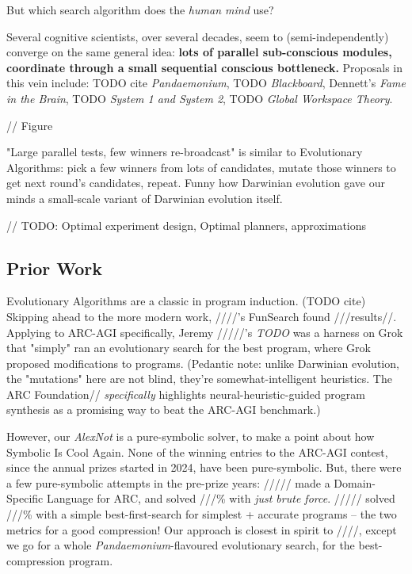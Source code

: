 \documentclass{article}
\begin{document}
But which search algorithm does the \textit{human mind} use?

Several cognitive scientists, over several decades, seem to (semi-independently) converge on the same general idea: \textbf{lots of parallel sub-conscious modules, coordinate through a small sequential conscious bottleneck.} Proposals in this vein include: TODO cite \textit{Pandaemonium}, TODO \textit{Blackboard}, Dennett's \textit{Fame in the Brain}, TODO \textit{System 1 and System 2}, TODO \textit{Global Workspace Theory}.

// Figure

"Large parallel tests, few winners re-broadcast" is similar to Evolutionary Algorithms: pick a few winners from lots of candidates, mutate those winners to get next round's candidates, repeat. Funny how Darwinian evolution gave our minds a small-scale variant of Darwinian evolution itself.

// TODO: Optimal experiment design, Optimal planners, approximations

\subsection{Prior Work}

Evolutionary Algorithms are a classic in program induction. (TODO cite) Skipping ahead to the more modern work, ////'s FunSearch found ///results//. Applying to ARC-AGI specifically, Jeremy /////'s \textit{TODO} was a harness on Grok that "simply" ran an evolutionary search for the best program, where Grok proposed modifications to programs. (Pedantic note: unlike Darwinian evolution, the "mutations" here are not blind, they're somewhat-intelligent heuristics. The ARC Foundation// \textit{specifically} highlights neural-heuristic-guided program synthesis as a promising way to beat the ARC-AGI benchmark.)

However, our \textit{AlexNot} is a pure-symbolic solver, to make a point about how Symbolic Is Cool Again. None of the winning entries to the ARC-AGI contest, since the annual prizes started in 2024, have been pure-symbolic. But, there were a few pure-symbolic attempts in the pre-prize years: ///// made a Domain-Specific Language for ARC, and solved ///\% with \textit{just brute force}. ///// solved ///\% with a simple best-first-search for simplest + accurate programs -- the two metrics for a good compression! Our approach is closest in spirit to ////, except we go for a whole \textit{Pandaemonium}-flavoured evolutionary search, for the best-compression program. 
\end{document}
